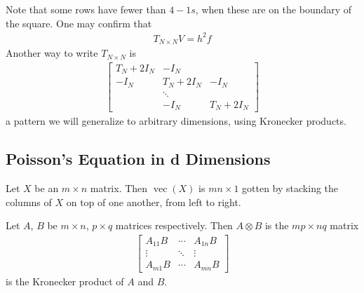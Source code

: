 \documentclass[11pt]{article}
\numberwithin{equation}{section}
\begin{document}
Note that some rows have fewer than $4 -1s$, when these are on the boundary of the square. One may confirm that \begin{align*}
    T_{N \times N} V = h^2 f
\end{align*}
Another way to write $T_{N \times N}$ is \begin{align*}
    \left[\begin{array}{ccc}T_{N}+2 I_{N} & -I_{N} & \\ -I_{N} & T_{N}+2 I_{N} & -I_{N} \\ & \ddots & \\ & -I_{N} & T_{N}+2 I_{N}\end{array}\right]
\end{align*}
a pattern we will generalize to arbitrary dimensions, using Kronecker products.

\subsection{Poisson's Equation in d Dimensions}
\begin{definition}
    Let $X$ be an $m \times n$ matrix. Then $\operatorname{vec}(X)$ is $mn \times 1$ gotten by stacking the columns of $X$ on top of one another, from left to right.
\end{definition}

\begin{definition}
    Let $A$, $B$ be $m \times n$, $p \times q$ matrices respectively. Then $A \otimes B$ is the $mp \times nq$ matrix \begin{align*}
        \left[\begin{array}{ccc}A_{11} {B} & \cdots & A_{1 n} {B} \\ \vdots & \ddots & \vdots \\ A_{m 1} {B} & \cdots & A_{m n} {B}\end{array}\right]
    \end{align*}
    is the Kronecker product of $A$ and $B$.
\end{definition}
\end{document}
